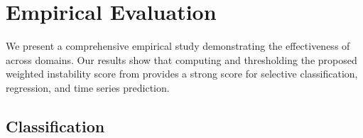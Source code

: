 
\section{Empirical Evaluation}
\label{sec:emp_eval}

We present a comprehensive empirical study demonstrating the effectiveness of \sptd across domains. Our results show that computing and thresholding the proposed weighted instability score from \sptd provides a strong score for selective classification, regression, and time series prediction.

\subsection{Classification}


